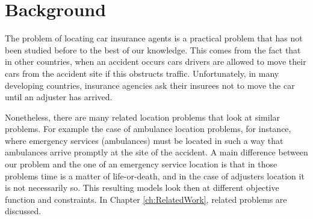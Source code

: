 \section{Background}
The problem of locating car insurance agents
is a practical problem
that has not been studied before
to the best of our knowledge.
This comes
from the fact
that in other countries,
when an accident occurs
cars drivers
are allowed to move their cars
from the accident site
if this obstructs traffic.
Unfortunately,
in many developing countries,
insurance agencies
ask their insurees
not to move the car
until an adjuster has arrived.

Nonetheless,
there are many related location problems
that look at similar problems.
For example
the case of
ambulance location problems,
for instance,
where emergency services (ambulances)
must be located
in such a way that
ambulances arrive promptly
at the site of the accident.
A main difference
between our problem
and the one
of an emergency service location
is that in those problems
time is a matter of life-or-death,
and in the case of adjusters location
it is not necessarily so.
This resulting models
look then at different objective function
and constraints.
In Chapter \ref{ch:RelatedWork},
related problems are discussed.
